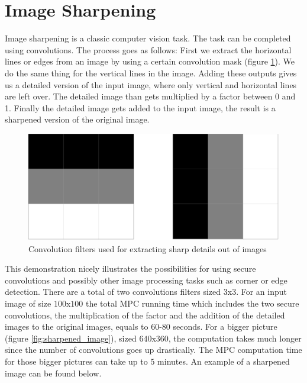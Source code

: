 \section{Image Sharpening}
Image sharpening is a classic computer vision task. The task can be completed using convolutions. The process goes as follows: First we extract the horizontal lines or edges from an image by using a certain convolution mask (figure \ref{fig:sharp_mask}). We do the same thing for the vertical lines in the image. Adding these outputs gives us a detailed version of the input image, where only vertical and horizontal lines are left over. The detailed image than gets multiplied by a factor between 0 and 1. Finally the detailed image gets added to the input image, the result is a sharpened version of the original image.

\begin{figure}[H]
  \includegraphics[scale=0.2]{fig/sharp_mask.png}
  \centering
  \caption{Convolution filters used for extracting sharp details out of images}
  \label{fig:sharp_mask}
\end{figure}

This demonstration nicely illustrates the possibilities for using secure convolutions and possibly other image processing tasks such as corner or edge detection. There are a total of two convolutions filters sized $3$x$3$. For an input image of size $100$x$100$ the total MPC running time which includes the two secure convolutions, the multiplication of the factor and the addition of the detailed images to the original images, equals to 60-80 seconds. For a bigger picture (figure \ref{fig:sharpened_image}), sized $640$x$360$, the computation takes much longer since the number of convolutions goes up drastically. The MPC computation time for those bigger pictures can take up to 5 minutes. An example of a sharpened image can be found below.

